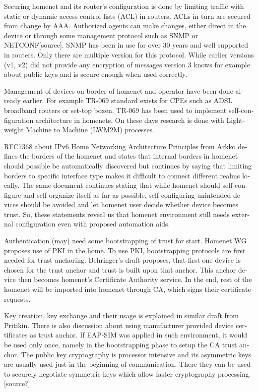 \documentclass[12pt,a4paper,english]{tutthesis}
\begin{document}
\begin{otherlanguage}{english}
Securing homenet and its router's configuration is done by limiting
traffic with static or dynamic access control lists (ACL) in
routers. ACLs in turn are secured from change by AAA. Authorized
agents can make changes, either direct in the device or through some
management protocol such as SNMP or NETCONF[source].  SNMP has been in
use for over 30 years and well supported in routers. Only there are
multiple version for this protocol. While earlier versions (v1, v2)
did not provide any encryption of messages version 3 knows for example
about public keys and is secure enough when used correctly.


Management of devices on border of homenet and operator have 
been done already earlier. For example TR-069 standard
exists\cite{iptvtr069} for CPEs such as ADSL broadband routers or
set-top boxen. TR-069 has been used to implement self-configuration
archi\-tecture in
homenets\cite{tr069rachidi2011}.
On these days research is done with Light-weight Machine to Machine
(LWM2M) processes. 


RFC7368 about IPv6 Home Networking Architecture Principles from
Arkko\cite{rfc7368} defines the borders of the homenet and states that
internal borders in homenet should possible be automatically
discovered but continues by saying that limiting borders to specific
interface type makes it difficult to connect different realms locally.
The same document continues stating
that while homenet should self-configure and self-organize itself as
far as possible, self-configuring unintended devices should be
avoided and let homenet user decide whether device becomes trust.
So, these statements reveal us that homenet environment still needs
external configuration even with proposed automation aids.





Authentication (may) need some bootstrapping of trust for start.
Homenet WG proposes use of PKI in the home.  To use PKI, bootstrapping
protocols are first needed for trust anchoring.  Behringer's
draft\cite{draft-behringer-bootstrap} proposes, that first one device
is chosen for the trust anchor and trust is built upon that
anchor. This anchor device then becomes homenet's Certificate
Authority service. In the end, rest of the homenet will be imported
into homenet through CA, which signs their certificate requests.

Key creation, key exchange and their usage is explained in similar
draft from Pritikin\cite{draft-pritikin-bootstrap}. There is also discussion about using
manufacturer provided device certificates as trust anchor.  If EAP-SIM
was applied in such environment, it would be used only once, namely in
the bootstrapping phase to setup the CA trust anchor.  The public key
cryptography is processor intensive and its asymmetric keys are
usually used just in the beginning of communication. There they can be
used to securely negotiate symmetric keys which allow faster
cryptography processing. [source?]



\end{otherlanguage}
\end{document}
